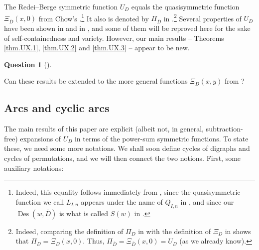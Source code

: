 \documentclass[numbers=enddot,12pt,final,onecolumn,notitlepage]{scrartcl}%
\numberwithin{exer}{section}
\theoremstyle{definition}
\newtheorem{quest}[theo]{Question}
\newenvironment{question}[1][]
{\begin{quest}[#1]\begin{leftbar}}
{\end{leftbar}\end{quest}}
\newenvironment{question}[1][Question]{\noindent\textbf{#1.} }{\ \rule{0.5em}{0.5em}}
\begin{document}
The Redei--Berge symmetric function $U_{D}$ equals the quasisymmetric function
$\Xi_{\overline{D}}\left(  x,0\right)  $ from Chow's \cite{Chow96}%
.\footnote{Indeed, this equality follows immediately from \cite[Proposition
7]{Chow96}, since the quasisymmetric function we call $L_{I,n}$ appears under
the name of $Q_{I,n}$ in \cite{Chow96}, and since our $\operatorname*{Des}%
\left(  w,\overline{D}\right)  $ is what is called $S\left(  w\right)  $ in
\cite{Chow96}.} It also is denoted by $\Pi_{\overline{D}}$ in \cite{Wisema07}%
.\footnote{Indeed, comparing the definition of $\Pi_{D}$ in \cite[Definition
2.2]{Wisema07} with the definition of $\Xi_{D}$ in \cite[\S 2]{Chow96} shows
that $\Pi_{D}=\Xi_{D}\left(  x,0\right)  $. Thus, $\Pi_{\overline{D}}%
=\Xi_{\overline{D}}\left(  x,0\right)  =U_{D}$ (as we already know).} Several
properties of $U_{D}$ have been shown in \cite{Chow96} and in \cite{Wisema07},
and some of them will be reproved here for the sake of self-containedness and
variety. However, our main results -- Theorems \ref{thm.UX.1}, \ref{thm.UX.2}
and \ref{thm.UX.3} -- appear to be new.

\begin{question}
Can these results be extended to the more general functions $\Xi_{D}\left(
x,y\right)  $ from \cite{Chow96}?
\end{question}

\subsection{Arcs and cyclic arcs}

The main results of this paper are explicit (albeit not, in general,
subtraction-free) expansions of $U_{D}$ in terms of the power-sum symmetric
functions. To state these, we need some more notations. We shall soon define
cycles of digraphs and cycles of permutations, and we will then connect the
two notions. First, some auxiliary notations:
\end{document}
